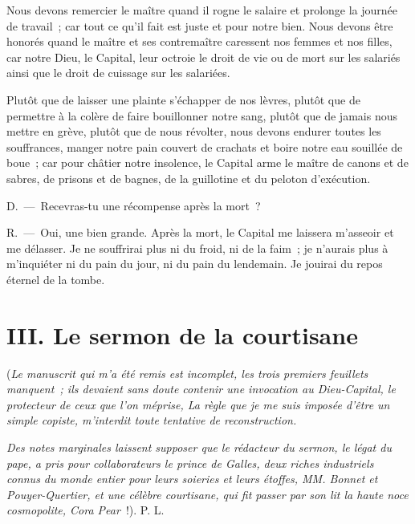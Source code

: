 \documentclass[french,twoside]{book} %
\begin{document}
Nous devons remercier le maître quand il rogne le salaire et prolonge la journée de travail ; car tout ce qu’il fait est juste et pour notre bien. Nous devons être honorés quand le maître et ses contremaître caressent nos femmes et nos filles, car notre Dieu, le Capital, leur octroie le droit de vie ou de mort sur les salariés ainsi que le droit de cuissage sur les salariées.\par
Plutôt que de laisser une plainte s’échapper de nos lèvres, plutôt que de permettre à la colère de faire bouillonner notre sang, plutôt que de jamais nous mettre en grève, plutôt que de nous révolter, nous devons endurer toutes les souffrances, manger notre pain couvert de crachats et boire notre eau souillée de boue ; car pour châtier notre insolence, le Capital arme le maître de canons et de sabres, de prisons et de bagnes, de la guillotine et du peloton d’exécution.\par
D. — Recevras-tu une récompense après la mort ?\par
R. — Oui, une bien grande. Après la mort, le Capital me laissera m’asseoir et me délasser. Je ne souffrirai plus ni du froid, ni de la faim ; je n’aurais plus à m’inquiéter ni du pain du jour, ni du pain du lendemain. Je jouirai du repos éternel de la tombe.
\section[{III. Le sermon de la courtisane}]{III. Le sermon de la courtisane}\renewcommand{\leftmark}{III. Le sermon de la courtisane}

\noindent (\emph{Le manuscrit qui m’a été remis est incomplet, les trois premiers feuillets manquent ; ils devaient sans doute contenir une invocation au Dieu-Capital, le protecteur de ceux que l’on méprise, La règle que je me suis imposée d’être un simple copiste, m’interdit toute tentative de reconstruction.}\par
\emph{Des notes marginales laissent supposer que le rédacteur du sermon, le légat du pape, a pris pour collaborateurs le prince de Galles, deux riches industriels connus du monde entier pour leurs soieries et leurs étoffes, MM. Bonnet et Pouyer-Quertier, et une célèbre courtisane, qui fit passer par son lit la haute noce cosmopolite, Cora Pear} !). P. L.\par

\begin{center}
\noindent *\par
\end{center}
\end{document}
